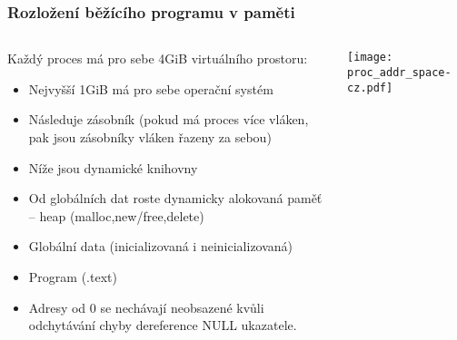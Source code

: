 \documentclass{beamer}
\begin{document}
\begin{frame}
\frametitle{Rozložení běžícího programu v paměti}

\begin{columns}
\begin{column}{0.75\textwidth}
Každý proces má pro sebe 4GiB virtuálního prostoru:
\small
\begin{itemize}
\item Nejvyšší 1GiB má pro sebe operační systém
\item Následuje zásobník (pokud má proces více vláken, pak jsou zásobníky vláken řazeny za sebou)
\item Níže jsou dynamické knihovny
\item Od globálních dat roste dynamicky alokovaná paměť -- heap (malloc,new/free,delete)
\item Globální data (inicializovaná i neinicializovaná)
\item Program (.text)
\item Adresy od 0 se nechávají neobsazené kvůli odchytávání chyby dereference NULL ukazatele.
\end{itemize}
\end{column}   
\begin{column}{0.25\textwidth}  
\texttt{[image: proc\_addr\_space-cz.pdf]}
\end{column}
\end{columns}
\end{frame}
\end{document}
